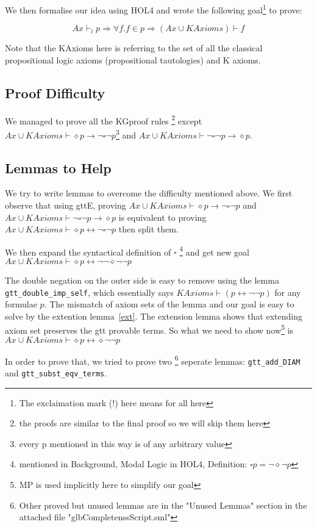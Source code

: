 \documentclass[submission,copyright,creativecommons]{eptcs}
\begin{document}
We then formalise our idea using HOL4 and wrote the following goal\footnote{The exclaimation mark (!) here means for all here} to prove:


$$Ax \vdash_l p \Rightarrow \forall f. f \in p \Rightarrow (Ax\cup KAxioms) \vdash f$$

Note that the KAxioms here is referring to the set of all the classical propositional 
logic axioms (propositional tautologies) and K axioms. 

\subsection{Proof Difficulty}
\label{difficulty}
We managed to prove all the KGproof rules
\footnote{the proofs are similar to the final proof so we will skip them here} 
except $Ax \cup KAxioms \vdash \diamond p \rightarrow \neg \square \neg p$\footnote{every p mentioned 
in this way is of any arbitrary value} and 
$Ax \cup KAxioms \vdash \neg \square \neg p \rightarrow \diamond p$. 


\subsection{Lemmas to Help} 
We try to write lemmas to overcome the difficulty mentioned above.
We first observe that using gttE, proving $Ax \cup KAxioms \vdash \diamond p \rightarrow \neg \square \neg p$ and 
$Ax \cup KAxioms \vdash \neg \square \neg p \rightarrow \diamond p$ is equivalent to 
proving  $Ax \cup KAxioms \vdash \diamond p \leftrightarrow \neg \square \neg p$ then split them.

We then expand the syntactical definition of $\square$ 
\footnote{mentioned in Background, Modal Logic in HOL4, Definition: $\square p = \neg \diamond \neg p $} and 
get new goal  $Ax \cup KAxioms \vdash \diamond p \leftrightarrow \neg \neg \diamond \neg \neg p$ 

The double negation on the outer side is easy to remove using the lemma 
\texttt{gtt\_double\_imp\_self}, which essentially says $KAxioms \vdash (p \leftrightarrow \neg \neg p)$
for any formulae $p$. The mismatch of axiom sets of the lemma and our goal is easy 
to solve by the extention lemma~\ref{ext}. The 
extension lemma shows that extending axiom set preserves the gtt provable terms.  So what we need to show now\footnote{MP is 
used implicitly here to simplify our goal} is 
$Ax \cup KAxioms \vdash \diamond p \leftrightarrow \diamond \neg \neg p$ 

In order to prove that, we tried to prove two
\footnote{Other proved but unused lemmas are in the "Unused Lemmas" section in the attached file "glbCompletenssScript.sml"} seperate lemmas: \texttt{gtt\_add\_DIAM}
and \texttt{gtt\_subst\_eqv\_terms}.
\end{document}
